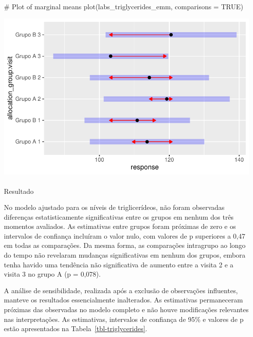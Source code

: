 \documentclass[
  12pt,
]{article}
\makeatletter
\let\oldparagraph\paragraph
\renewcommand{\paragraph}{
    \@ifstar
      \xxxParagraphStar
      \xxxParagraphNoStar
  }
\newcommand{\xxxParagraphStar}[1]{\oldparagraph*{#1}\mbox{}}
\newcommand{\xxxParagraphNoStar}[1]{\oldparagraph{#1}\mbox{}}
\newenvironment{Shaded}{\begin{snugshade}}{\end{snugshade}}
\newcommand{\AttributeTok}[1]{\textcolor[rgb]{0.40,0.45,0.13}{#1}}
\newcommand{\CommentTok}[1]{\textcolor[rgb]{0.37,0.37,0.37}{#1}}
\newcommand{\ConstantTok}[1]{\textcolor[rgb]{0.56,0.35,0.01}{#1}}
\newcommand{\FunctionTok}[1]{\textcolor[rgb]{0.28,0.35,0.67}{#1}}
\newcommand{\NormalTok}[1]{\textcolor[rgb]{0.00,0.23,0.31}{#1}}
\makeatother
\begin{document}
\begin{Shaded}
\begin{Highlighting}[]
\CommentTok{\# Plot of marginal means}
\FunctionTok{plot}\NormalTok{(labs\_triglycerides\_emm, }\AttributeTok{comparisons =} \ConstantTok{TRUE}\NormalTok{)}
\end{Highlighting}
\end{Shaded}

\includegraphics{Outcomes_files/figure-pdf/labs_triglycerides_sens_emm-1.pdf}

\paragraph{Resultado}\label{resultado-7}

No modelo ajustado para os níveis de triglicerídeos, não foram
observadas diferenças estatisticamente significativas entre os grupos em
nenhum dos três momentos avaliados. As estimativas entre grupos foram
próximas de zero e os intervalos de confiança incluíram o valor nulo,
com valores de p superiores a 0,47 em todas as comparações. Da mesma
forma, as comparações intragrupo ao longo do tempo não revelaram
mudanças significativas em nenhum dos grupos, embora tenha havido uma
tendência não significativa de aumento entre a visita 2 e a visita 3 no
grupo A (p = 0,078).

A análise de sensibilidade, realizada após a exclusão de observações
influentes, manteve os resultados essencialmente inalterados. As
estimativas permaneceram próximas das observadas no modelo completo e
não houve modificações relevantes nas interpretações. As estimativas,
intervalos de confiança de 95\% e valores de p estão apresentados na
Tabela~\ref{tbl-triglycerides}.
\end{document}
